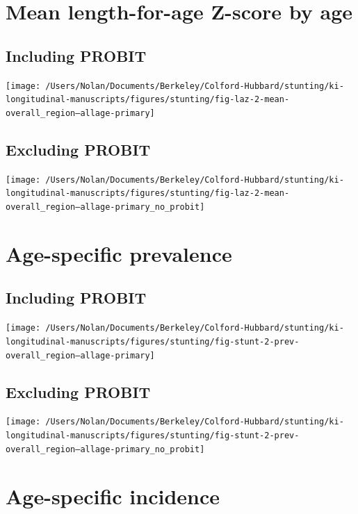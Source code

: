 \documentclass[9pt,]{book}
\begin{document}
\section{Mean length-for-age Z-score by
age}\label{mean-length-for-age-z-score-by-age-1}

\subsection{Including PROBIT}\label{including-probit}

\texttt{[image: /Users/Nolan/Documents/Berkeley/Colford-Hubbard/stunting/ki-longitudinal-manuscripts/figures/stunting/fig-laz-2-mean-overall\_region--allage-primary]}

\subsection{Excluding PROBIT}\label{excluding-probit}

\texttt{[image: /Users/Nolan/Documents/Berkeley/Colford-Hubbard/stunting/ki-longitudinal-manuscripts/figures/stunting/fig-laz-2-mean-overall\_region--allage-primary\_no\_probit]}

\section{Age-specific prevalence}\label{age-specific-prevalence-1}

\subsection{Including PROBIT}\label{including-probit-1}

\texttt{[image: /Users/Nolan/Documents/Berkeley/Colford-Hubbard/stunting/ki-longitudinal-manuscripts/figures/stunting/fig-stunt-2-prev-overall\_region--allage-primary]}

\subsection{Excluding PROBIT}\label{excluding-probit-1}

\texttt{[image: /Users/Nolan/Documents/Berkeley/Colford-Hubbard/stunting/ki-longitudinal-manuscripts/figures/stunting/fig-stunt-2-prev-overall\_region--allage-primary\_no\_probit]}

\section{Age-specific incidence}\label{age-specific-incidence-1}
\end{document}
